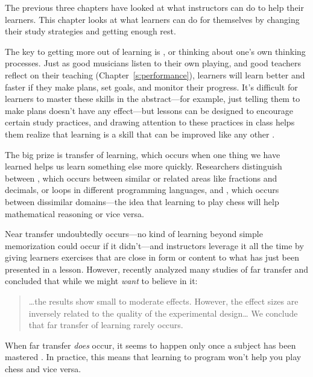 
The previous three chapters have looked at what instructors can do to
help their learners. This chapter looks at what learners can do for
themselves by changing their study strategies and getting enough rest.

The key to getting more out of learning is
, or thinking about one's
own thinking processes. Just as good musicians listen to their own
playing, and good teachers reflect on their teaching
(Chapter~\ref{s:performance}), learners will learn better and faster if
they make plans, set goals, and monitor their progress. It's difficult
for learners to master these skills in the abstract---for example, just
telling them to make plans doesn't have any effect---but lessons can be
designed to encourage certain study practices, and drawing attention to
these practices in class helps them realize that learning is a skill
that can be improved like any other \cite{McGu2015,Miya2018}.

The big prize is transfer of learning, which occurs when one thing we
have learned helps us learn something else more quickly. Researchers
distinguish between , which occurs
between similar or related areas like fractions and decimals, or loops
in different programming languages, and , which occurs between dissimilar
domains---the idea that learning to play chess will help mathematical
reasoning or vice versa.

Near transfer undoubtedly occurs---no kind of learning beyond simple
memorization could occur if it didn't---and instructors leverage it all
the time by giving learners exercises that are close in form or content
to what has just been presented in a lesson. However, \cite{Sala2017}
recently analyzed many studies of far transfer and concluded that while
we might \emph{want} to believe in it:

\begin{quote}

{\ldots}the results show small to moderate effects. However, the
effect sizes are inversely related to the quality of the experimental
design{\ldots} We conclude that far transfer of learning rarely
occurs.

\end{quote}

When far transfer \emph{does} occur, it seems to happen only once a subject
has been mastered \cite{Gick1987}. In practice, this means that
learning to program won't help you play chess and vice versa.

